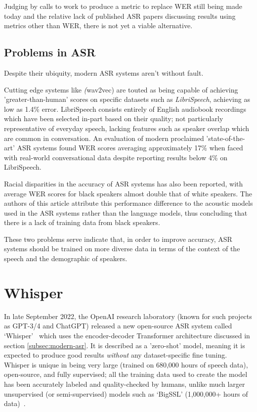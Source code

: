 Judging by calls to work to produce a metric to replace WER still being made today\cite{pasandi2022evaluation, szymanski2020we} and the relative lack of published ASR papers discussing results using metrics other than WER, there is not yet a viable alternative.

\subsection{Problems in ASR}

Despite their ubiquity, modern ASR systems aren't without fault.

Cutting edge systems like \emph(wav2vec) are touted as being capable of achieving 'greater-than-human' scores on specific datasets\cite{wav2vec2,bigssl,chung2021} such as \emph{LibriSpeech}\cite{librispeech}, achieving as low as 1.4\% error\cite{zhang2020}.
LibriSpeech consists entirely of English audiobook recordings which have been selected in-part based on their quality\cite{librispeech}; not particularly representative of everyday speech\cite{szymanski2020we}, lacking features such as speaker overlap which are common in conversation\cite{shriberg2001observations}.
An evaluation of modern proclaimed 'state-of-the-art' ASR systems found WER scores averaging approximately 17\% when faced with real-world conversational data\cite{szymanski2020we} despite reporting results below 4\% on LibriSpeech.

Racial disparities in the accuracy of ASR systems has also been reported, with average WER scores for black speakers almost double that of white speakers\cite{koenecke2020racial}.
The authors of this article attribute this performance difference to the acoustic models used in the ASR systems rather than the language models, thus concluding that there is a lack of training data from black speakers.

These two problems serve indicate that, in order to improve accuracy, ASR systems should be trained on more diverse data in terms of the context of the speech and the demographic of speakers.

\section{Whisper}

In late September 2022, the OpenAI research laboratory (known for such projects as GPT-3/4 and ChatGPT) released a new open-source ASR system called `Whisper'~\cite{whisper} which uses the encoder-decoder Transformer architecture discussed in section \ref{subsec:modern-asr}.
It is described as a 'zero-shot' model, meaning it is expected to produce good results \emph{without} any dataset-specific fine tuning.
Whisper is unique in being very large (trained on 680,000 hours of speech data), open-source, and fully supervised;
all the training data used to create the model has been accurately labeled and quality-checked by humans, unlike much larger unsupervised (or semi-supervised) models such as `BigSSL' (1,000,000+ hours of data)~\cite{bigssl}.

